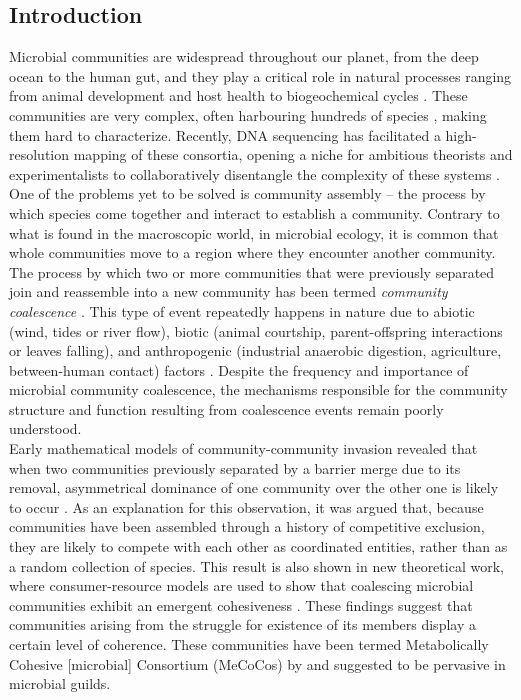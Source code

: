 \documentclass[titlepage,11pt]{article}
\begin{document}
\begin{linenumbers}
\begin{singlespace}
		\section{Introduction}
		Microbial communities are widespread throughout our planet, from the deep ocean to the human gut, and they play a critical role in natural processes ranging from animal development and host health \citep{Huttenhower2012} to biogeochemical cycles \citep{Falkowski2008}. These communities are very complex, often harbouring hundreds of species \citep{Gilbert2014}, making them hard to characterize. Recently, DNA sequencing has facilitated a high-resolution mapping of these consortia, opening a niche for ambitious theorists and experimentalists to collaboratively disentangle the complexity of these systems \citep{Marsland2019, Goldford2018, Goyal2018, Friedman2017, Costello2012, Vil}. One of the problems yet to be solved is community assembly -- the process by which species come together and interact to establish a community. Contrary to what is found in the macroscopic world, in microbial ecology, it is common that whole communities move to a region where they encounter another community. The process by which two or more communities that were previously separated join and reassemble into a new community has been termed \textit{community coalescence} \citep{Rillig2015}. This type of event repeatedly happens in nature due to abiotic (wind, tides or river flow), biotic (animal courtship, parent-offspring interactions or leaves falling), and anthropogenic (industrial anaerobic digestion, agriculture, between-human contact) factors \citep{Castledine2020}. Despite the frequency and importance of microbial community coalescence, the mechanisms responsible for the community structure and function resulting from coalescence events remain poorly understood.\\
		Early mathematical models of community-community invasion revealed that when two communities previously separated by a barrier merge due to its removal, asymmetrical dominance of one community over the other one is likely to occur \citep{Gilpin1994, Toquenaga1997}. As an explanation for this observation, it was argued that, because communities have been assembled through a history of competitive exclusion, they are likely to compete with each other as coordinated entities, rather than as a random collection of species. This result is also shown in new theoretical work, where consumer-resource models are used to show that coalescing microbial communities exhibit an emergent cohesiveness \citep{Tikhonov2016, Tikhonov2017}. These findings suggest that communities arising from the struggle for existence of its members display a certain level of coherence. These communities have been termed Metabolically Cohesive [microbial] Consortium (MeCoCos) by \citet{Pascual-Garcia2020} and suggested to be pervasive in microbial guilds.\\ 

\end{singlespace}
\end{linenumbers}
\end{document}
